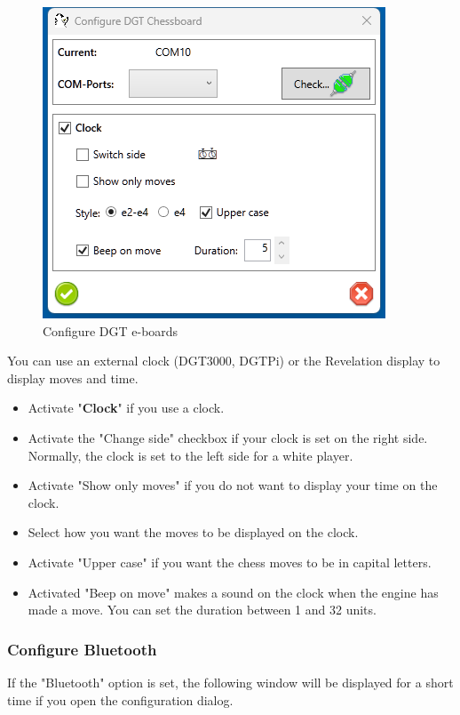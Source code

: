 \documentclass[11pt,a4paper]{article}
\begin{document}
\begin{figure}[H]
	\centering
	\includegraphics[scale=1.0]{DGTEBoard2.png}
	\caption{Configure DGT e-boards }
	\label{fig:DGTEBoard2}
\end{figure}

You can use an external clock (DGT3000, DGTPi) or the Revelation display to display moves and time.
\begin{itemize}
	\item Activate "\textbf{Clock}" if you use a clock.
	\item Activate the "Change side" checkbox if your clock is set on the right side. Normally, the clock is set to the left side for a white player. 
	\item Activate "Show only moves" if you do not want to display your time on the clock.
	\item Select how you want the moves to be displayed on the clock.
    \item Activate "Upper case" if you want the chess moves  to be in capital letters.
    \item Activated "Beep on move" makes a sound on the clock when the engine has made a move. You can set the duration between 1 and 32 units.
\end{itemize}


\subsubsection{Configure Bluetooth} \label{BluetoothDGT}

If the "Bluetooth" option is set, the following window will be displayed for a short time if you open the configuration dialog.
\end{document}
